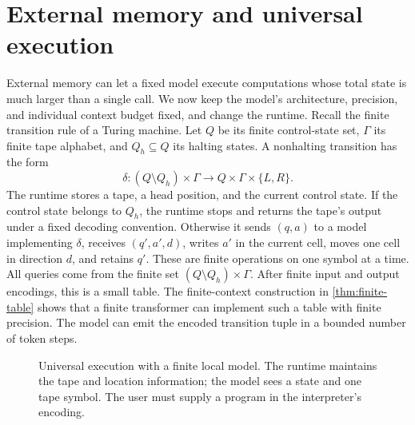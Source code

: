 \documentclass[11pt,twoside]{article}
\newcommand{\enc}{\operatorname{enc}}
\theoremstyle{definition}
\theoremstyle{remark}
\begin{document}
\section{External memory and universal execution}
\label{sec:tape}

External memory can let a fixed model execute computations whose total state
is much larger than a single call. We now keep the model's architecture,
precision, and individual context budget fixed, and change the runtime.
Recall the finite transition rule of a
Turing machine. Let $Q$ be its finite control-state set, $\Gamma$ its finite
tape alphabet, and $Q_h\subseteq Q$ its halting states. A nonhalting
transition has the form
\begin{equation}
 \delta:(Q\setminus Q_h)\times\Gamma
 \longrightarrow Q\times\Gamma\times\{L,R\}.
 \label{eq:tm-rule}
\end{equation}
The runtime stores a tape, a head position, and the current control state.
If the control state belongs to $Q_h$, the runtime stops and returns the
tape's output under a fixed decoding convention. Otherwise it sends
$(q,a)$ to a model implementing $\delta$, receives
$(q',a',d)$, writes $a'$ in the current cell, moves one cell in direction
$d$, and retains $q'$. These are finite operations on one symbol at a time.
All queries come from the finite set $(Q\setminus Q_h)\times\Gamma$.
After finite input and output encodings, this is a small table. The
finite-context construction in \cref{thm:finite-table} shows that a finite
transformer can implement such a table with finite precision. The model
can emit the encoded transition tuple in a bounded number of token steps.

\begin{figure}[htbp]
\centering
{}
\caption{Universal execution with a finite local model. The runtime
maintains the tape and location information; the model sees a state and
one tape symbol. The user must supply a program in the interpreter's
encoding.}
\label{fig:tape}
\end{figure}
\end{document}
